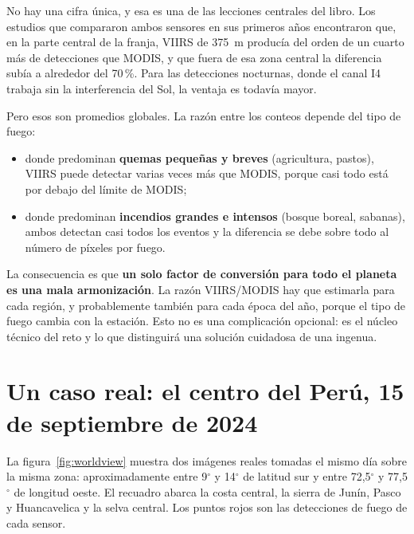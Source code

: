 No hay una cifra única, y esa es una de las lecciones centrales del libro. Los estudios que
compararon ambos sensores en sus primeros años encontraron que, en la parte central de la franja,
VIIRS de 375~m producía del orden de un cuarto más de detecciones que MODIS, y que fuera de esa
zona central la diferencia subía a alrededor del 70\,{}\%. Para las detecciones nocturnas, donde
el canal I4 trabaja sin la interferencia del Sol, la ventaja es todavía mayor.

Pero esos son promedios globales. La razón entre los conteos depende del tipo de fuego:

\begin{itemize}
  \item donde predominan \textbf{quemas pequeñas y breves} (agricultura, pastos), VIIRS puede
  detectar varias veces más que MODIS, porque casi todo está por debajo del límite de MODIS;
  \item donde predominan \textbf{incendios grandes e intensos} (bosque boreal, sabanas), ambos
  detectan casi todos los eventos y la diferencia se debe sobre todo al número de píxeles por
  fuego.
\end{itemize}

\begin{parareto}
La consecuencia es que \textbf{un solo factor de conversión para todo el planeta es una mala
armonización}. La razón VIIRS/MODIS hay que estimarla para cada región, y probablemente también
para cada época del año, porque el tipo de fuego cambia con la estación. Esto no es una
complicación opcional: es el núcleo técnico del reto y lo que distinguirá una solución cuidadosa
de una ingenua.
\end{parareto}

\section{Un caso real: el centro del Perú, 15 de septiembre de 2024}

La figura~\ref{fig:worldview} muestra dos imágenes reales tomadas el mismo día sobre la misma
zona: aproximadamente entre 9$^\circ$ y 14$^\circ$ de latitud sur y entre 72,5$^\circ$ y
77,5$^\circ$ de longitud oeste. El recuadro abarca la costa central, la sierra de Junín, Pasco y
Huancavelica y la selva central. Los puntos rojos son las detecciones de fuego de cada sensor.

